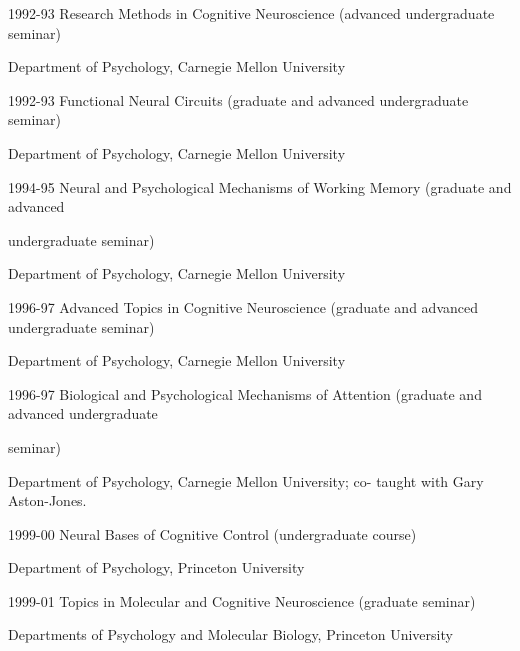 \documentclass[10 pt]{article}
\begin{document}
1992-93 \hspace{0.3in} Research Methods in Cognitive Neuroscience (advanced undergraduate seminar)

\hspace{0.81in} Department of Psychology, Carnegie Mellon University
    \smallskip

1992-93 \hspace{0.3in} Functional Neural Circuits (graduate and advanced undergraduate seminar)

\hspace{0.81in} Department of Psychology, Carnegie Mellon University
    \smallskip

1994-95 \hspace{0.3in} Neural and Psychological Mechanisms of Working Memory (graduate and advanced

\hspace{0.81in} undergraduate seminar)

\hspace{0.81in} Department of Psychology, Carnegie Mellon University
    \smallskip

1996-97 \hspace{0.3in} Advanced Topics in Cognitive Neuroscience (graduate and advanced undergraduate seminar)

\hspace{0.81in} Department of Psychology, Carnegie Mellon University
    \smallskip

1996-97 \hspace{0.3in} Biological and Psychological Mechanisms of Attention (graduate and advanced undergraduate

\hspace{0.81in} seminar)

\hspace{0.81in} Department of Psychology, Carnegie Mellon University; co-
taught with Gary Aston-Jones.
    \smallskip

1999-00 \hspace{0.3in} Neural Bases of Cognitive Control (undergraduate course)

\hspace{0.81in} Department of Psychology, Princeton University
    \smallskip

1999-01 \hspace{0.3in} Topics in Molecular and Cognitive Neuroscience (graduate seminar)

\hspace{0.81in} Departments of Psychology and Molecular Biology, Princeton University
    \smallskip
\end{document}
